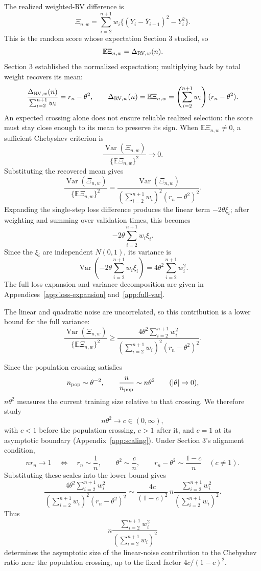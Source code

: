 \documentclass[11pt]{article}
\theoremstyle{definition}
\begin{document}
The realized weighted-RV difference is
\[
\Xi_{n,w}=\sum_{i=2}^{n+1}w_i
\{(Y_i-\bar Y_{i-1})^2-Y_i^2\}.
\]
This is the random score whose expectation Section 3 studied, so
\[
\mathbb E\Xi_{n,w}=\Delta_{{\rm RV},w}(n).
\]
Section 3 established the normalized expectation; multiplying back
by total weight recovers its mean:
\[
\frac{\Delta_{{\rm RV},w}(n)}{\sum_{i=2}^{n+1}w_i}
=r_n-\theta^2,
\qquad
\Delta_{{\rm RV},w}(n)=\mathbb E\Xi_{n,w}
=\left(\sum_{i=2}^{n+1}w_i\right)(r_n-\theta^2).
\]
An expected crossing alone does not ensure reliable realized selection:
the score must stay close enough to its mean to preserve its sign.
When $\mathbb E\Xi_{n,w}\ne0$, a sufficient Chebyshev criterion is
\[
\frac{\operatorname{Var}(\Xi_{n,w})}
{\{\mathbb E\Xi_{n,w}\}^2}\to0.
\]
Substituting the recovered mean gives
\[
\frac{\operatorname{Var}(\Xi_{n,w})}{\{\mathbb E\Xi_{n,w}\}^2}
=\frac{\operatorname{Var}(\Xi_{n,w})}
{\left(\sum_{i=2}^{n+1}w_i\right)^2(r_n-\theta^2)^2}.
\]
Expanding the single-step loss difference produces the linear term
$-2\theta\xi_i$; after weighting and summing over validation times,
this becomes
\[
-2\theta\sum_{i=2}^{n+1}w_i\xi_i.
\]
Since the $\xi_i$ are independent $N(0,1)$, its variance is
\[
\operatorname{Var}\!\left(
-2\theta\sum_{i=2}^{n+1}w_i\xi_i\right)
=4\theta^2\sum_{i=2}^{n+1}w_i^2.
\]
The full loss expansion and variance decomposition are given in
Appendices~\ref{app:loss-expansion} and~\ref{app:full-var}.

The linear and quadratic noise are uncorrelated, so this contribution
is a lower bound for the full variance:
\[
\frac{\operatorname{Var}(\Xi_{n,w})}{\{\mathbb E\Xi_{n,w}\}^2}
\ge\frac{4\theta^2\sum_{i=2}^{n+1}w_i^2}
{\left(\sum_{i=2}^{n+1}w_i\right)^2(r_n-\theta^2)^2}.
\]

Since the population crossing satisfies
\[
n_{\rm pop}\sim\theta^{-2},\qquad
\frac{n}{n_{\rm pop}}\sim n\theta^2
\qquad(|\theta|\to0),
\]
$n\theta^2$ measures the current training size relative to that crossing.
We therefore study
\[
n\theta^2\to c\in(0,\infty),
\]
with $c<1$ before the population crossing, $c>1$ after it, and
$c=1$ at its asymptotic boundary
(Appendix~\ref{app:scaling}). Under Section 3's alignment condition,
\[
nr_n\to1\quad\Longleftrightarrow\quad r_n\sim\frac1n,
\qquad
\theta^2\sim\frac cn,\qquad
r_n-\theta^2\sim\frac{1-c}{n}\quad(c\ne1).
\]
Substituting these scales into the lower bound gives
\[
\frac{4\theta^2\sum_{i=2}^{n+1}w_i^2}
{\left(\sum_{i=2}^{n+1}w_i\right)^2(r_n-\theta^2)^2}
\sim\frac{4c}{(1-c)^2}\,
n\frac{\sum_{i=2}^{n+1}w_i^2}
{\left(\sum_{i=2}^{n+1}w_i\right)^2}.
\]
Thus
\[
n\frac{\sum_{i=2}^{n+1}w_i^2}
{\left(\sum_{i=2}^{n+1}w_i\right)^2}
\]
determines the asymptotic size of the linear-noise contribution to the
Chebyshev ratio near the population crossing, up to the fixed factor
$4c/(1-c)^2$.
\end{document}
